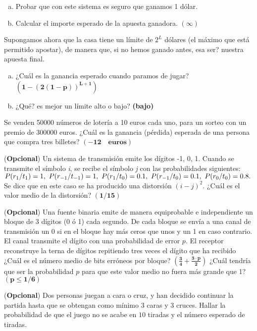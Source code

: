\documentclass[12pt]{article}
\begin{document}
\begin{enumerate}[a)]
\item Probar  que con este sistema es seguro que ganamos 1 dólar.
\item Calcular el importe esperado de la apuesta ganadora. $\mathbf{(\infty)}$
\end{enumerate}


Supongamos ahora que la casa tiene un límite de $2^L$ dólares (el máximo que está permitido
apostar), de manera que, si no hemos ganado antes, esa ser? nuestra apuesta final.

\begin{enumerate}[a)]
\item  ¿Cuál es la ganancia esperado cuando paramos de jugar?
$\mathbf{(1-(2(1-p))^{L+1})}$
\item ¿Qué? es mejor un límite alto o bajo?  \textbf{(bajo)}
\end{enumerate}

\probl Se venden 50000 números de lotería a 10 euros cada uno, para  un sorteo con un
premio de  300000 euros. ¿Cuál es la ganancia (pérdida) esperada de una persona que compra
tres billetes? $\mathbf{(-12\quad \textrm{euros})}$


\probl (\textbf{Opcional}) Un sistema de transmisión emite los dígitos -1, 0, 1. Cuando se transmite el símbolo
{\it i}, se recibe el símbolo {\it j} con las probabilidades siguientes: $ P(r_1 / t_1) =
1, \ P(r_{-1} / t_{-1}) = 1, \ P(r_1 / t_0) = 0.1, \ P(r_{-1} / t_0) = 0.1, \ P(r_0
/ t_0) = 0.8. $ Se dice que en este caso se ha producido una distorsión $ \displaystyle
(i-j)^2. $ ¿Cuál es el valor medio de la distorsión? $\mathbf{(1/15)}$

\probl (\textbf{Opcional}) Una fuente  binaria emite de manera equiprobable e independiente un bloque  de 3
dígitos (0 ó 1) cada segundo. De cada bloque se envía a una canal de transmisión un 0 si en
el bloque hay más ceros que unos y un 1 en caso contrario. El canal transmite el dígito con
una probabilidad de error $p$. El receptor reconstruye la terna de dígitos repitiendo tres
veces el dígito que ha recibido ¿Cuál es el número medio de bits erróneos por bloque?
$\mathbf{(\frac{3}{4}+\frac{3\cdot p}{2})}$ ¿Cuál tendría que ser la probabilidad $p$ para
que este valor medio no fuera más grande que 1?  $\mathbf{(p \leq 1/6)}$

\probl (\textbf{Opcional})  Dos personas juegan a cara o cruz, y han decidido continuar la partida hasta que se
obtengan como mínimo $3$ caras  y $3$ cruces. Hallar la probabilidad de que el juego no se
acabe en $10$ tiradas y el número esperado de tiradas.
\end{document}
